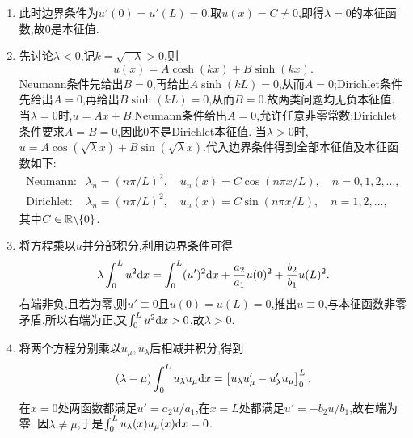 \documentclass{ctexart}
\begin{document}
\begin{solution}
\begin{enumerate}[label=\tbf{(\arabic*)}]
        \item 此时边界条件为$u'(0)=u'(L)=0$.取$u(x)=C\neq0$,即得$\lambda=0$的本征函数,故$0$是本征值.
        \item 先讨论$\lambda<0$,记$k=\sqrt{-\lambda}>0$,则
            \[u(x)=A\cosh(kx)+B\sinh(kx).\]
            Neumann条件先给出$B=0$,再给出$A\sinh(kL)=0$,从而$A=0$;Dirichlet条件先给出$A=0$,再给出$B\sinh(kL)=0$,从而$B=0$.故两类问题均无负本征值.
            当$\lambda=0$时,$u=Ax+B$.Neumann条件给出$A=0$,允许任意非零常数;Dirichlet条件要求$A=B=0$,因此$0$不是Dirichlet本征值.
            当$\lambda>0$时,$u=A\cos(\sqrt\lambda x)+B\sin(\sqrt\lambda x)$.代入边界条件得到全部本征值及本征函数如下:
            \[\begin{array}{ll}
                \text{Neumann:}&\lambda_n=(n\pi/L)^2,\quad
                    u_n(x)=C\cos(n\pi x/L),\quad n=0,1,2,\ldots,\\[3pt]
                \text{Dirichlet:}&\lambda_n=(n\pi/L)^2,\quad
                    u_n(x)=C\sin(n\pi x/L),\quad n=1,2,\ldots,
            \end{array}\]
            其中$C\in\mathbb{R}\backslash\{0\}$.
        \item 将方程乘以$u$并分部积分,利用边界条件可得
            \[\lambda\int_0^Lu^2\mathrm{d} x
                =\int_0^L(u')^2\mathrm{d} x+\dfrac{a_2}{a_1}u(0)^2+\dfrac{b_2}{b_1}u(L)^2.\]
            右端非负,且若为零,则$u'\equiv0$且$u(0)=u(L)=0$,推出$u\equiv0$,与本征函数非零矛盾.所以右端为正,又$\int_0^Lu^2\mathrm{d} x>0$,故$\lambda>0$.
        \item 将两个方程分别乘以$u_\mu,u_\lambda$后相减并积分,得到
            \[(\lambda-\mu)\int_0^Lu_\lambda u_\mu\mathrm{d} x
                =\left[u_\lambda u_\mu'-u_\lambda'u_\mu\right]_0^L.\]
            在$x=0$处两函数都满足$u'=a_2u/a_1$,在$x=L$处都满足$u'=-b_2u/b_1$,故右端为零.
            因$\lambda\neq\mu$,于是$\int_0^Lu_\lambda(x)u_\mu(x)\mathrm{d} x=0$.
    \end{enumerate}
\end{solution}
\end{document}
